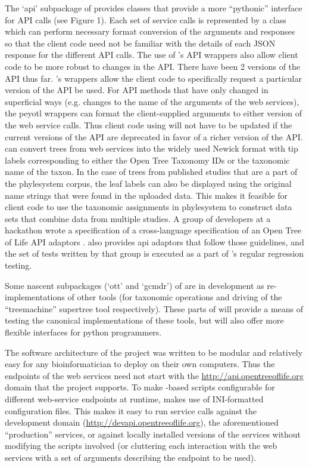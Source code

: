 \begin{methods}
The `api' subpackage of \pey provides classes that provide a more ``pythonic'' interface 
for \otol API calls (see Figure 1).
Each set of service calls is represented by a class which can perform necessary 
    format conversion of the arguments and responses so that the client code need 
    not be familiar with the details of each JSON response for the different API calls.
The use of \pey's API wrappers also allow client code to be more robust to changes in the API.
There have been 2 versions of the \otol API thus far.
\pey's wrappers allow the client code to specifically request a particular version of the API be used.
For API methods that have only changed in superficial ways (e.g. changes to the name of 
the arguments of the web services), the peyotl wrappers can format the client-supplied arguments
to either version of the web service calls.
Thus client code using \pey will not have to be updated if the current versions of the
    API are deprecated in favor of a richer version of the \otol API.
\pey can convert trees from \otol web services into the widely used Newick format with tip
    labels corresponding to either the Open Tree Taxonomy IDs or the taxonomic name of the taxon.
In the case of trees from published studies that are a part of the phylesystem corpus, the
    leaf labels can also be displayed using the original name strings that were found in
    the uploaded data.
This makes it feasible for client code to use the taxonomic assignments in phylesystem to 
    construct data sets that combine data from multiple studies.
A group of developers at a hackathon wrote a specification of a cross-language specification
of an Open Tree of Life API adaptors \citep{sharedapitests}.
\pey also provides api adaptors that follow those guidelines, and the set of
    tests written by that group is executed as a part of \pey's regular regression testing.


Some nascent subpackages (`ott' and `gcmdr') of \pey are in development as re-implementations
    of other \otol tools (for taxonomic operations and driving of the ``treemachine'' supertree tool
    respectively).
These parts of \pey will provide a means of testing the canonical implementations of these
    tools, but will also offer more flexible interfaces for python programmers.

The software architecture of the \otol project was written to be modular and relatively 
    easy for any bioinformatician to deploy on their own computers.
Thus the endpoints of the \otol web services need not start with the \url{http://api.opentreeoflife.org} domain that the project supports.
To make \pey-based scripts configurable for different web-service endpoints at runtime, \pey
    makes use of INI-formatted configuration files.
This makes it easy to run service calls against the development domain (\url{http://devapi.opentreeoflife.org}), the aforementioned ``production'' services, or against locally installed
versions of the services without modifying the scripts involved (or cluttering each interaction with the web services with a set of arguments describing the endpoint to be used).

\end{methods}
